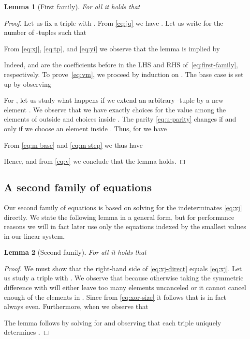 \documentclass{amsart}
\newtheorem{Lem}{Lemma}
\begin{document}
\begin{Lem}[First family]
\label{lem:first}
For all  it holds that 

\end{Lem}
\begin{proof}
Let us fix a triple  with 
. From \eqref{eq:jq} we have .
Let us write  for the
number of -tuples  
such that 

From \eqref{eq:xj}, \eqref{eq:tp}, and \eqref{eq:yi} we observe 
that the lemma is implied by

Indeed,  and  are the coefficients before  in the LHS and RHS of~\eqref{eq:first-family}, respectively.
To prove~\eqref{eq:vm}, we proceed by induction on . The base case  is set up by
observing

For , let us study what happens if we extend
an arbitrary -tuple 
by a new element . We observe that we have exactly  
choices for the value  among the elements of  outside 
 and  choices inside . 
The parity \eqref{eq:u-parity} changes if and only if 
we choose an element inside .
Thus, for  we have

From \eqref{eq:m-base} and \eqref{eq:m-step} we thus have

Hence,  and from \eqref{eq:v} we conclude that the
lemma holds.

\end{proof}

\subsection{A second family of equations}

Our second family of equations is based on solving for the 
indeterminates \eqref{eq:xj} directly. We state the following
lemma in a general form, but for performance reasons we will 
in fact later use only the equations indexed by the  smallest 
values  in our linear system.

\begin{Lem}[Second family]
\label{lem:second}
For all  it holds that

\end{Lem}
\begin{proof}
We must show that the right-hand side of \eqref{eq:xj-direct} equals
\eqref{eq:xj}. Let us study a triple  
with . We observe that  
because otherwise taking the symmetric difference with  will either 
leave too many elements uncanceled or it cannot cancel enough of 
the elements in . Since  from \eqref{eq:xor-size} 
it follows that  is in fact always even. 
Furthermore, when  we observe that 

The lemma follows by solving for  and observing that
each triple  uniquely determines .
\end{proof}
\end{document}
